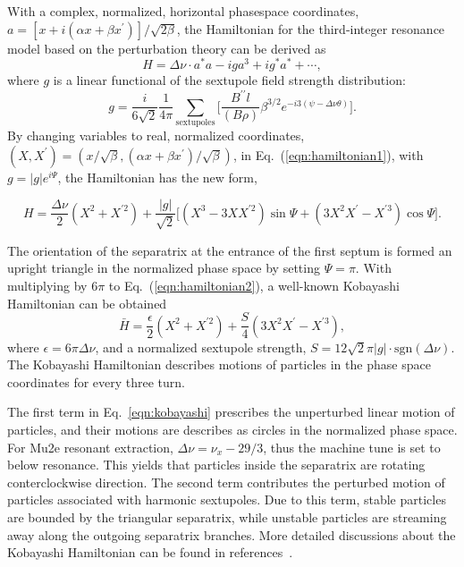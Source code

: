 \documentclass[aps,prstab,onecolumn,preprint,endfloats,11pt]{revtex4-1}
\begin{document}
With a complex, normalized, horizontal phasespace coordinates, $a = [x + i (\alpha x + \beta x^{\prime})] / \sqrt{2 \beta}$, the Hamiltonian for the third-integer resonance model based on the perturbation theory can be derived as~\cite{preliminary}
\begin{equation}
  H = \Delta \nu \cdot a^{*} a - i g a^{3} + i g^{*} a^{*} + \cdots,
\label{eqn:hamiltonian1}
\end{equation}
where $g$ is  a linear functional of the sextupole field strength distribution:
\begin{equation}
  g = \frac{i}{6 \sqrt{2}} \frac{1}{4 \pi} \sum_{\text{sextupoles}}
      \Bigg[
        \frac{B^{\prime\prime} l}{(B\rho)} \beta^{3/2}
        e^{-i 3(\psi - \Delta \nu \theta)}
      \Bigg].
\end{equation}
By changing variables to real, normalized coordinates, $(X, X^{\prime}) = (x/\sqrt{\beta}, (\alpha x + \beta x^{\prime}) / \sqrt{\beta})$, in Eq.~(\ref{eqn:hamiltonian1}), with $g = |g| e^{i \Psi}$, the Hamiltonian has the new form,
\begin{widetext}
\begin{equation}
  H = \frac{\Delta \nu}{2} \left( X^{2} + X^{\prime2} \right)
    + \frac{|g|}{\sqrt{2}}
      \Big[
        \left( X^{3} - 3 X X^{\prime 2} \right) \sin{\Psi}
      + \left( 3 X^{2} X^{\prime} - X^{\prime 3} \right) \cos{\Psi}
      \Big].
\label{eqn:hamiltonian2}
\end{equation}
\end{widetext}
The orientation of the separatrix at the entrance of the first septum is formed an upright triangle in the normalized phase space by setting $\Psi = \pi$. With multiplying by $6 \pi$ to Eq.~(\ref{eqn:hamiltonian2}), a well-known Kobayashi Hamiltonian can be obtained
\begin{equation}
  \bar{H} = \frac{\epsilon}{2} \left( X^{2} + X^{\prime2} \right)
    + \frac{S}{4} \left( 3 X^{2} X^{\prime} - X^{\prime 3} \right),
\label{eqn:kobayashi}
\end{equation}
where $\epsilon = 6\pi \Delta \nu$, and a normalized sextupole strength, $S = 12\sqrt{2} \pi |g| \cdot \text{sgn}(\Delta \nu)$. The Kobayashi Hamiltonian describes motions of particles in the phase space coordinates for every three turn.

The first term in Eq.~\ref{eqn:kobayashi} prescribes the unperturbed linear motion of particles, and their motions are describes as circles in the normalized phase space. For Mu2e resonant extraction, $\Delta \nu = \nu_{x} - 29/3$, thus the machine tune is set to below resonance. This yields that particles inside the separatrix are rotating conterclockwise direction. The second term contributes the perturbed motion of particles associated with harmonic sextupoles. Due to this term, stable particles are bounded by the triangular separatrix, while unstable particles are streaming away along the outgoing separatrix branches. More detailed discussions about the Kobayashi Hamiltonian can be found in references~\cite{pullia}.
\end{document}
